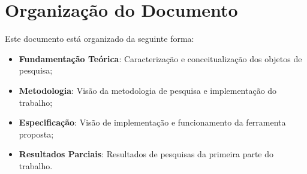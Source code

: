\section{Organização do Documento}
\label{sec:org}

Este documento está organizado da seguinte forma:

\begin{itemize}
  \item \textbf{Fundamentação Teórica}: Caracterização e conceitualização dos
    objetos de pesquisa;
  \item \textbf{Metodologia}: Visão da metodologia de pesquisa e implementação
    do trabalho;
  \item \textbf{Especificação}: Visão de implementação e funcionamento da
    ferramenta proposta;
  \item \textbf{Resultados Parciais}: Resultados de pesquisas da primeira
    parte do trabalho.
\end{itemize}

